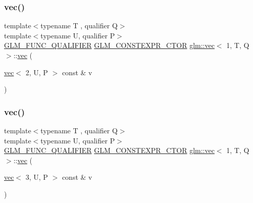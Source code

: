 \mbox{\label{structglm_1_1vec_3_011_00_01_t_00_01_q_01_4_ab8eadeb013caada0e6a27cfa842ca8da}} 
\subsubsection{\texorpdfstring{vec()}{vec()}\hspace{0.1cm}{\footnotesize\ttfamily [12/14]}}
{\footnotesize\ttfamily template$<$typename T , qualifier Q$>$ \\
template$<$typename U, qualifier P$>$ \\
\mbox{\hyperlink{setup_8hpp_a33fdea6f91c5f834105f7415e2a64407}{G\+L\+M\+\_\+\+F\+U\+N\+C\+\_\+\+Q\+U\+A\+L\+I\+F\+I\+ER}} \mbox{\hyperlink{setup_8hpp_ad34178a09666081abdb573c14d1f4a5a}{G\+L\+M\+\_\+\+C\+O\+N\+S\+T\+E\+X\+P\+R\+\_\+\+C\+T\+OR}} \mbox{\hyperlink{structglm_1_1vec}{glm\+::vec}}$<$ 1, T, Q $>$\+::\mbox{\hyperlink{structglm_1_1vec}{vec}} (\begin{DoxyParamCaption}\item[{\mbox{\hyperlink{structglm_1_1vec}{vec}}$<$ 2, U, P $>$ const \&}]{v }\end{DoxyParamCaption})}

\mbox{\label{structglm_1_1vec_3_011_00_01_t_00_01_q_01_4_adb99870d209d6225f67a5d12e8f04df5}} 
\subsubsection{\texorpdfstring{vec()}{vec()}\hspace{0.1cm}{\footnotesize\ttfamily [13/14]}}
{\footnotesize\ttfamily template$<$typename T , qualifier Q$>$ \\
template$<$typename U, qualifier P$>$ \\
\mbox{\hyperlink{setup_8hpp_a33fdea6f91c5f834105f7415e2a64407}{G\+L\+M\+\_\+\+F\+U\+N\+C\+\_\+\+Q\+U\+A\+L\+I\+F\+I\+ER}} \mbox{\hyperlink{setup_8hpp_ad34178a09666081abdb573c14d1f4a5a}{G\+L\+M\+\_\+\+C\+O\+N\+S\+T\+E\+X\+P\+R\+\_\+\+C\+T\+OR}} \mbox{\hyperlink{structglm_1_1vec}{glm\+::vec}}$<$ 1, T, Q $>$\+::\mbox{\hyperlink{structglm_1_1vec}{vec}} (\begin{DoxyParamCaption}\item[{\mbox{\hyperlink{structglm_1_1vec}{vec}}$<$ 3, U, P $>$ const \&}]{v }\end{DoxyParamCaption})}

